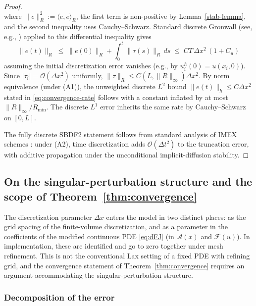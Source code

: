 \documentclass[11pt]{article}
\begin{document}
\begin{proof}
\begin{equation}
    \end{equation}
    where $\|e\|_R^2 := \langle e, e\rangle_R$, the first term is non-positive by Lemma~\ref{stab-lemma}, and the second inequality uses Cauchy--Schwarz. Standard discrete Gronwall (see, e.g., \cite{ThomasTAM22}) applied to this differential inequality gives
    \begin{equation}
        \|e(t)\|_R \;\leq\; \|e(0)\|_R + \int_0^t \|\tau(s)\|_R\, ds \;\leq\; C T\, \Delta x^2\, (1 + C_u) \label{eq:gronwall-bound}
    \end{equation}
    assuming the initial discretization error vanishes (e.g., by $u^h_i(0) = u(x_i, 0)$). Since $|\tau_i| = \mathcal{O}(\Delta x^2)$ uniformly, $\|\tau\|_R \leq C(L, \|R\|_\infty)\Delta x^2$. By norm equivalence (under (A1)), the unweighted discrete $L^2$ bound $\|e(t)\|_h \le C \Delta x^2$ stated in \eqref{eq:convergence-rate} follows with a constant inflated by at most $\|R\|_\infty/R_{\min}$. The discrete $L^1$ error inherits the same rate by Cauchy--Schwarz on $[0,L]$.

    The fully discrete SBDF2 statement follows from standard analysis of IMEX schemes \cite{ARW1995}: under (A2), time discretization adds $\mathcal{O}(\Delta t^2)$ to the truncation error, with additive propagation under the unconditional implicit-diffusion stability.
\end{proof}


\subsection{On the singular-perturbation structure and the scope of Theorem~\ref{thm:convergence}}\label{sec:singular-perturbation}

The discretization parameter $\Delta x$ enters the model in two distinct places: as the grid spacing of the finite-volume discretization, and as a parameter in the coefficients of the modified continuous PDE \eqref{eq:dFJ} (in $\mathcal{A}(x)$ and $\mathcal{F}(u)$). In implementation, these are identified and go to zero together under mesh refinement. This is not the conventional Lax setting of a fixed PDE with refining grid, and the convergence statement of Theorem~\ref{thm:convergence} requires an argument accommodating the singular-perturbation structure.

\subsubsection{Decomposition of the error}\label{sec:error-decomp}
\end{document}
